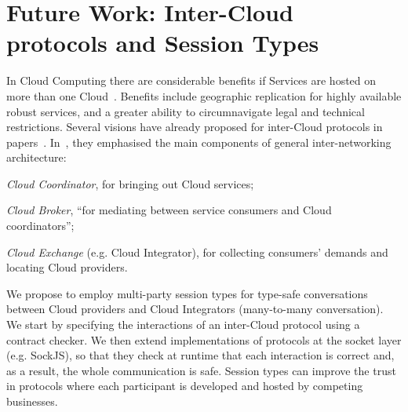 \documentclass[10pt]{llncs}
\begin{document}


\section{Future Work: Inter-Cloud protocols and Session Types}
\label{sect:highlights}
In Cloud Computing there are considerable benefits if Services are hosted on more than one Cloud~\cite{Armbrust2010,Buyya2009,intercloud}. Benefits include geographic replication for highly available robust services, and a greater ability to circumnavigate legal and technical restrictions. 
Several visions have already proposed for inter-Cloud protocols in papers~\cite{utility-driven-fed,xmpp-intercloud-transport,cloud-integrator}. In~\cite{utility-driven-fed}, they emphasised the main components of general inter-networking architecture:
\begin{inparaenum}
\item \textit{Cloud Coordinator}, for bringing out Cloud services;
\item \textit{Cloud Broker}, ``for mediating between service consumers and Cloud coordinators'';
\item \textit{Cloud Exchange} (e.g. Cloud Integrator), for collecting consumers' demands and locating Cloud providers. %
\end{inparaenum}

We propose to employ multi-party session types \cite{ng2012multiparty} for type-safe conversations between Cloud providers and Cloud Integrators (many-to-many conversation).
We start by specifying the interactions of an inter-Cloud protocol using a contract checker.
We then extend implementations of protocols at the socket layer (e.g. SockJS), so that they check at runtime that each interaction is correct and, as a result, the whole communication is safe.
Session types can improve the trust in protocols where each participant is developed and hosted by competing businesses.
\end{document}
